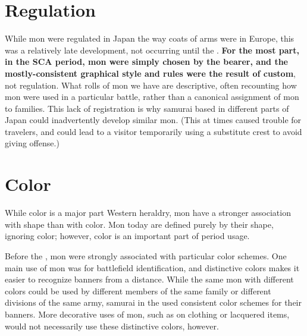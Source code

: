 \documentclass{article}
\begin{document}
\section{Regulation}

  While mon were regulated in Japan the way coats of arms were in
  Europe, this was a relatively late development, not occurring until
  the \EdoPeriod.  \textbf{For the most part, in the SCA period, mon were
  simply chosen by the bearer, and the mostly-consistent graphical
  style and rules were the result of custom}, not regulation.  What
  rolls of mon we have are descriptive, often recounting how mon were
  used in a particular battle, rather than a canonical assignment of
  mon to families.  This lack of registration is why samurai based in different
  parts of Japan could inadvertently develop similar mon.  (This at times
  caused trouble for travelers, and could lead to a visitor
  temporarily using a substitute crest to avoid giving
  offense.)

  \begin{figure}[b]
  \begin{subfigs}
  \end{subfigs}
  \end{figure}

\section{Color}

  While color is a major part Western heraldry, mon have a
  stronger association with shape than with color.  Mon today are
  defined purely by their shape, ignoring color; however, color is an
  important part of period usage.

  Before the \EdoPeriod, mon were strongly associated with particular
  color schemes.  One main use of mon was for battlefield
  identification, and distinctive colors makes it easier to recognize
  banners from a distance.  While the same mon with different colors
  could be used by different members of the same family or different
  divisions of the same army, samurai in the
  \SengokuPeriod{} used consistent color schemes for their banners.
  More decorative uses of mon, such as on clothing or lacquered items,
  would not necessarily use these distinctive colors, however.
\end{document}
